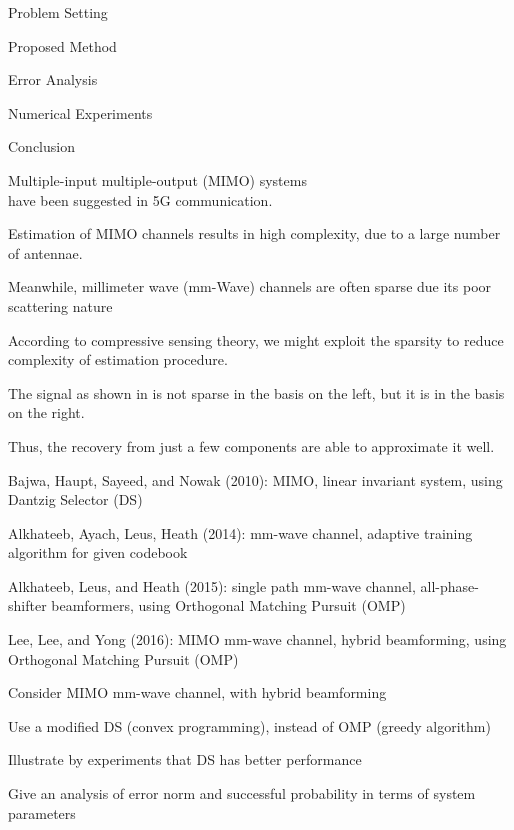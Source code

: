 

\Title {\TitleText}
\blank [big]

\Subtitle {\AuthorText}
\blank [big]

\Subsubtitle {\InstitutionText}

\page [yes]
{
\I Problem Setting

\I Proposed Method

\I Error Analysis

\I Numerical Experiments

\I Conclusion
}
{
\I Multiple-input multiple-output (MIMO) systems \\ have been suggested in 5G communication.

\I Estimation of MIMO channels results in high complexity, due to a large number of antennae.

\I Meanwhile, millimeter wave (mm-Wave) channels are often sparse due its poor scattering nature

\I According to compressive sensing theory, we might exploit the sparsity to reduce complexity of estimation procedure.
}
{
\blank [big]

\I The signal as shown in is not sparse in the basis on the left, but it is in the basis on the right.

\I Thus, the recovery from just a few components are able to approximate it well.
}
{
\I Bajwa, Haupt, Sayeed, and Nowak (2010): MIMO, linear invariant system, using Dantzig Selector (DS)

\I Alkhateeb, Ayach, Leus, Heath (2014): mm-wave channel, adaptive training algorithm for given codebook

\I Alkhateeb, Leus, and Heath (2015): single path mm-wave channel, all-phase-shifter beamformers,
using Orthogonal Matching Pursuit (OMP)

\I Lee, Lee, and Yong (2016): MIMO mm-wave channel, hybrid beamforming, using Orthogonal Matching Pursuit (OMP)
}
{
\I Consider MIMO mm-wave channel, with hybrid beamforming

\I Use a modified DS (convex programming), instead of OMP (greedy algorithm)

\I Illustrate by experiments that DS has better performance

\I Give an analysis of error norm and successful probability in terms of system parameters
}


